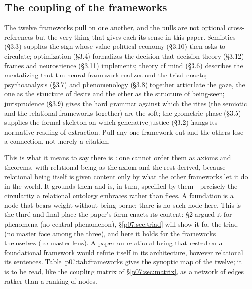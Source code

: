 \documentclass[11pt,a4paper]{article}
\newcommand{\emb}[1]{\textcolor{rose}{\oldtextbf{#1}}}
\newcommand{\xref}[1]{\textcolor{rose}{\S\ref{#1}}}
\newcommand{\pinkref}[1]{\textcolor{rose}{#1}}
\begin{document}
\subsection{The coupling of the frameworks}
The twelve frameworks pull on one another, and the pulls are not optional cross-references but the very thing that gives each its sense in this paper. Semiotics (\pinkref{§3.3}) supplies the sign whose value political economy (\pinkref{§3.10}) then asks to circulate; optimization (\pinkref{§3.4}) formalizes the decision that decision theory (\pinkref{§3.12}) frames and neuroscience (\pinkref{§3.11}) implements; theory of mind (\pinkref{§3.6}) describes the mentalizing that the neural framework realizes and the triad enacts; psychoanalysis (\pinkref{§3.7}) and phenomenology (\pinkref{§3.8}) together articulate the gaze, the one as the structure of desire and the other as the structure of being-seen; jurisprudence (\pinkref{§3.9}) gives the hard grammar against which the rites (the semiotic and the relational frameworks together) are the soft; the geometric phase (\pinkref{§3.5}) supplies the formal skeleton on which generative justice (\pinkref{§3.2}) hangs its normative reading of extraction. Pull any one framework out and the others lose a connection, not merely a citation.

This is what it means to say there is \emb{no foundational framework beneath the rest}: one cannot order them as axioms and theorems, with relational being as the axiom and the rest derived, because relational being itself is given content only by what the other frameworks let it do in the world. It grounds them and is, in turn, specified by them---precisely the circularity a relational ontology embraces rather than flees. A foundation is a node that bears weight without being borne; there is no such node here. This is the third and final place the paper's form enacts its content: \pinkref{§2} argued it for phenomena (no central phenomenon), \xref{p07:sec:triad} will show it for the triad (no master face among the three), and here it holds for the frameworks themselves (no master lens). A paper on relational being that rested on a foundational framework would refute itself in its architecture, however relational its sentences. Table~\pinkref{p07:tab:frameworks} gives the synoptic map of the twelve; it is to be read, like the coupling matrix of \xref{p07:sec:matrix}, as a network of edges rather than a ranking of nodes.
\end{document}
